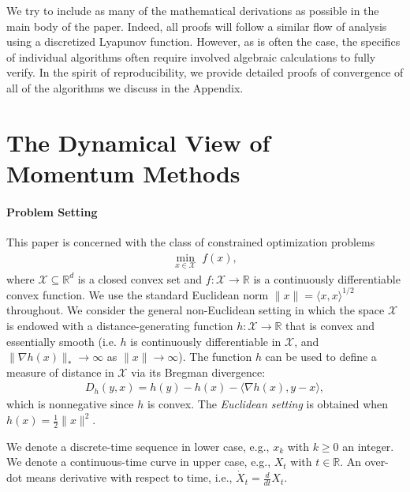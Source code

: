 \documentclass[11pt]{article}
\theoremstyle{plain}
\newcommand{\R}{{\mathbb R}}
\newcommand{\X}{{\mathcal X}}
\begin{document}
 We try to include as many of the mathematical derivations as possible in the main body of the paper.  Indeed, all proofs will follow a similar flow of analysis using a discretized Lyapunov function.  However, as is often the case, the specifics of individual algorithms often require involved algebraic calculations to fully verify.   In the spirit of reproducibility, we provide detailed proofs of convergence of all of the algorithms we discuss in the Appendix.

\section{The Dynamical View of Momentum Methods}

\paragraph{Problem Setting}
This paper is concerned with the class of constrained optimization problems
\begin{align}\label{eq:main-problem}
\min_{x \in \X} \; f(x),
\end{align}
where $\X \subseteq \R^d$ is a closed convex set and $f \colon \X \to \R$ is a continuously differentiable convex function. 
We use the standard Euclidean norm $\|x\| = \langle x,x \rangle^{1/2}$ throughout.
We consider the general non-Euclidean setting in which the space $\X$ is endowed with a distance-generating function $h \colon \X \to \R$ that is convex and essentially smooth (i.e. $h$ is continuously differentiable in $\X$, and $\|\nabla h(x)\|_* \to \infty$ as $\|x\| \to \infty$). The function $h$ can be used to define a measure of distance in $\X$ via its Bregman divergence:
\begin{align*}
D_h(y,x) = h(y) - h(x) - \langle \nabla h(x), y-x \rangle,
\end{align*}
which is nonnegative since $h$ is convex. 
The \emph{Euclidean setting} is obtained when $h(x) = \frac{1}{2} \|x\|^2$.

We denote a discrete-time sequence in lower case, e.g., $x_k$ with $k \ge 0$ an integer. We denote a continuous-time curve in upper case, e.g., $X_t$ with $t \in \R$. An over-dot means derivative with respect to time, i.e., $\dot X_t = \frac{d}{dt} X_t$.
\end{document}
